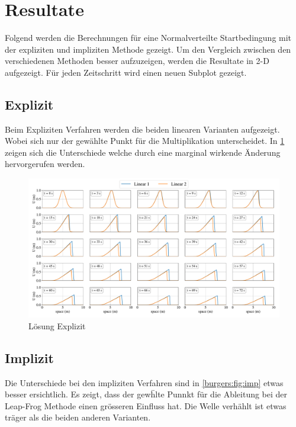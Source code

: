 %
%
\section{Resultate
\label{burgers:section:results}}

	Folgend werden die Berechnungen f\"ur eine Normalverteilte Startbedingung mit der expliziten und impliziten Methode gezeigt.
	Um den Vergleich zwischen den verschiedenen Methoden besser aufzuzeigen, werden die Resultate in 2-D aufgezeigt.
	F\"ur jeden Zeitschritt wird einen neuen Subplot gezeigt.
	
	\subsection{Explizit}

	Beim Expliziten Verfahren werden die beiden linearen Varianten aufgezeigt.
	Wobei sich nur der gew\"ahlte Punkt f\"ur die Multiplikation unterscheidet.
	In \ref{burgers:fig:ex} zeigen sich die Unterschiede welche durch eine marginal wirkende \"Anderung hervorgerufen werden.
	

    \begin{figure}
	\centering
	\includegraphics[width=1\textwidth]{papers/burgers/BurgersEquation/lin_paper.pdf}
	\caption{L\"osung Explizit}
	\label{burgers:fig:ex}
	\end{figure}
	
	\subsection{Implizit}

	Die Unterschiede bei den impliziten Verfahren sind in \ref{burgers:fig:imp} etwas besser ersichtlich.
	Es zeigt, dass der gew\"hlte Punnkt f\"ur die Ableitung bei der Leap-Frog Methode einen gr\"osseren Einfluss hat.
	Die Welle verh\"ahlt ist etwas tr\"ager als die beiden anderen Varianten.

